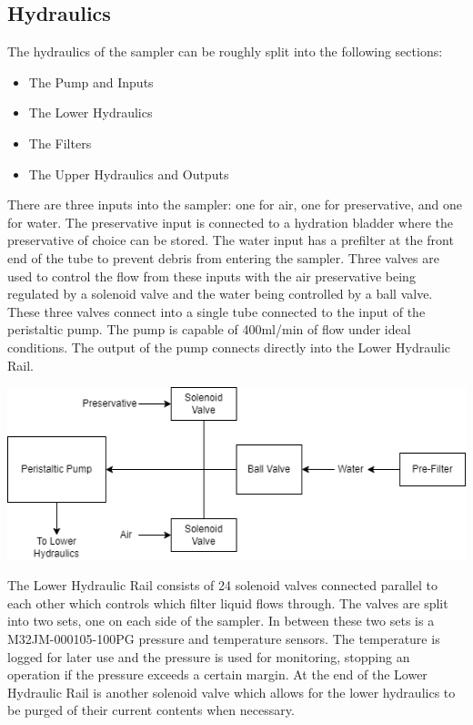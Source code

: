 \documentclass[11pt, letterpaper]{article}
\begin{document}

\subsection{Hydraulics}
The hydraulics of the sampler can be roughly split into the following sections:
\begin{itemize}
	\item The Pump and Inputs
	\item The Lower Hydraulics
	\item The Filters
	\item The Upper Hydraulics and Outputs
\end{itemize}
There are three inputs into the sampler: one for air, one for preservative, and one for water. The preservative input is connected to a hydration bladder where the preservative of choice can be stored. The water input has a prefilter at the front end of the tube to prevent debris from entering the sampler. Three valves are used to control the flow from these inputs with the air preservative being regulated by a solenoid valve and the water being controlled by a ball valve. These three valves connect into a single tube connected to the input of the peristaltic pump.
The pump is capable of 400ml/min of flow under ideal conditions. The output of the pump connects directly into the Lower Hydraulic Rail. 

\begin{center}
	\includegraphics[scale=0.75]{./Assets/PolyWAG_HX_HD_InHydr.png}
\end{center}

The Lower Hydraulic Rail consists of 24 solenoid valves connected parallel to each other which controls which filter liquid flows through. The valves are split into two sets, one on each side of the sampler. In between these two sets is a M32JM-000105-100PG pressure and temperature sensors. The temperature is logged for later use and the pressure is used for monitoring, stopping an operation if the pressure exceeds a certain margin. At the end of the Lower Hydraulic Rail is another solenoid valve which allows for the lower hydraulics to be purged of their current contents when necessary.
\end{document}
